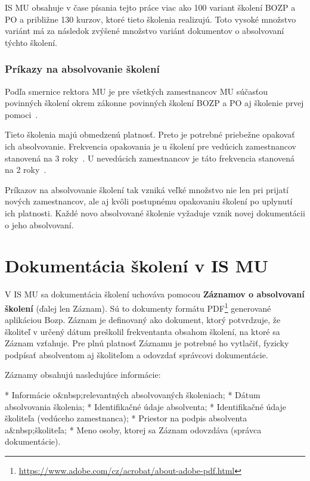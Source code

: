 \documentclass[
  digital,     %
  oneside,     %
  nosansbold,  %
  nocolorbold, %
  lof,         %
  nolot,         %
]{fithesis4}
\begin{document}
IS MU obsahuje v čase písania tejto práce viac ako 100 variant školení BOZP a PO a približne 130 kurzov, ktoré tieto školenia realizujú. Toto vysoké množstvo variánt má za následok zvýšené množstvo variánt dokumentov o absolvovaní týchto školení.

\subsection*{Príkazy na absolvovanie školení}
Podľa smernice rektora MU je pre všetkých zamestnancov MU súčasťou povinných školení okrem zákonne povinných školení BOZP a PO aj školenie prvej pomoci~\cites[sekcia~3.2.1,~bod~3.]{smernice_rektora_bozp}.

Tieto školenia majú obmedzenú platnosť. Preto je potrebné priebežne opakovať ich absolvovanie. Frekvencia opakovania je u školení pre vedúcich zamestnancov stanovená na 3 roky~\cites[sekcia~3.2.4,~bod~b)]{smernice_rektora_bozp}[čl.~4,~odst.~2~bod~c)]{smernice_mu_po}. U nevedúcich zamestnancov je táto frekvencia stanovená na 2 roky~\cites[sekcia~3.2.2,~bod~1.]{smernice_rektora_bozp}[čl.~10,~odst.~2]{smernice_mu_po}.

Príkazov na absolvovanie školení tak vzniká veľké množstvo nie len pri prijatí nových zamestnancov, ale aj kvôli postupnému opakovaniu školení po uplynutí ich platnosti. Každé novo absolvované školenie vyžaduje vznik novej dokumentácii o jeho absolvovaní.

\chapter{Dokumentácia školení v IS MU}
\label{kap-3}
V IS MU sa dokumentácia školení uchováva pomocou \textbf{Záznamov o absolvovaní školení} (ďalej len Záznam). Sú to dokumenty formátu PDF\footnote{\url{https://www.adobe.com/cz/acrobat/about-adobe-pdf.html}} generované aplikáciou Bozp. Záznam je definovaný ako dokument, ktorý potvrdzuje, že školiteľ v určený dátum preškolil frekventanta obsahom školení, na ktoré sa Záznam vzťahuje. Pre plnú platnosť Záznamu je potrebné ho vytlačiť, fyzicky podpísať absolventom aj školiteľom a odovzdať správcovi dokumentácie.

Záznamy obsahujú nasledujúce informácie:

\begin{markdown}
  * Informácie o&nbsp;relevantných absolvovaných školeniach;
  * Dátum absolvovania školenia;
  * Identifikačné údaje absolventa;
  * Identifikačné údaje školiteľa (vedúceho zamestnanca);
  * Priestor na podpis absolventa a&nbsp;školiteľa;
  * Meno osoby, ktorej sa Záznam odovzdáva (správca dokumentácie).
\end{markdown}
\end{document}
